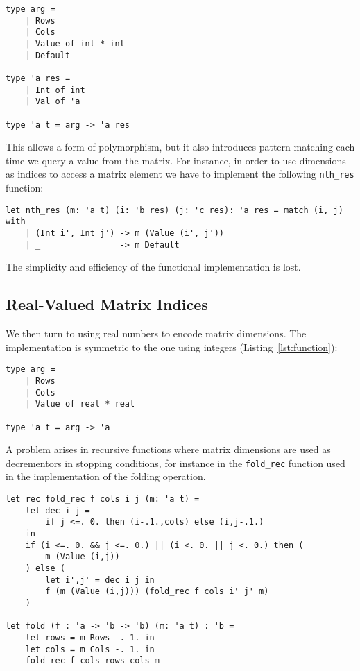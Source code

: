 \documentclass[runningheads]{llncs}
\begin{document}
\begin{lstlisting}
type arg =
	| Rows
	| Cols
	| Value of int * int
	| Default

type 'a res = 
	| Int of int
	| Val of 'a

type 'a t = arg -> 'a res
\end{lstlisting}

This allows a form of polymorphism, but it also introduces pattern matching each time we query a value from the matrix. For instance, in order to use dimensions as indices to access a matrix element we have to implement the following \lstinline{nth_res} function:  

\begin{lstlisting} 
let nth_res (m: 'a t) (i: 'b res) (j: 'c res): 'a res = match (i, j) with 
	| (Int i', Int j') -> m (Value (i', j'))
	| _                -> m Default
\end{lstlisting}

The simplicity and efficiency of the functional implementation is lost.

\subsection{Real-Valued Matrix Indices}

We then turn to using real numbers to encode matrix dimensions. The implementation is symmetric to the one using integers (Listing~\ref{lst:function}):

\begin{lstlisting}
type arg =
	| Rows
	| Cols
	| Value of real * real

type 'a t = arg -> 'a
\end{lstlisting}

\noindent A problem arises in recursive functions where matrix dimensions are used as decrementors in stopping conditions, for instance in the \lstinline{fold_rec} function used in the implementation of the folding operation.
\begin{lstlisting}
let rec fold_rec f cols i j (m: 'a t) =
	let dec i j =
		if j <=. 0. then (i-.1.,cols) else (i,j-.1.)
	in
	if (i <=. 0. && j <=. 0.) || (i <. 0. || j <. 0.) then (
		m (Value (i,j))
	) else (
		let i',j' = dec i j in
		f (m (Value (i,j))) (fold_rec f cols i' j' m)
	)

let fold (f : 'a -> 'b -> 'b) (m: 'a t) : 'b =
	let rows = m Rows -. 1. in
	let cols = m Cols -. 1. in
	fold_rec f cols rows cols m
\end{lstlisting}
\end{document}
